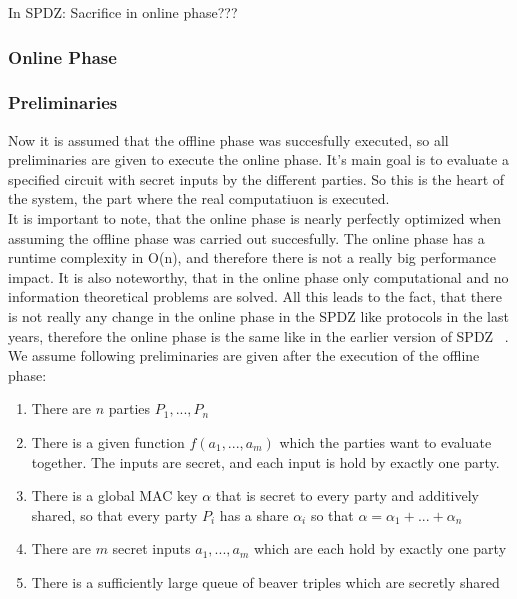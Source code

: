 \documentclass[english,runningheads,a4paper]{llncs}[2018/03/10]
\begin{document}
In SPDZ: Sacrifice in online phase???





\subsubsection{Online Phase}

\subsubsection{Preliminaries}


Now it is assumed that the offline phase was succesfully executed, so all preliminaries are given to execute the online phase. It's main goal is to evaluate a specified circuit with secret inputs by the different parties. So this is the heart of the system, the part where the real computatiuon is executed. \\
It is important to note, that the online phase is nearly perfectly optimized when assuming the offline phase was carried out succesfully. The online phase has a runtime complexity in O(n), and therefore there is not a really big performance impact. It is also noteworthy, that in the online phase only computational and no information theoretical problems are solved. All this leads to the fact, that there is not really any change in the online phase in the SPDZ like protocols in the last years, therefore the online phase is the same like in the earlier version of SPDZ  ~\cite{cryptoeprint:2011:535}.\\


We assume following preliminaries are given after the execution of the offline phase:\\
\begin{enumerate}
\item There are \(n\) parties \(P_1,...,P_n\)
\item There is a given function \(f(a_1,...,a_m)\) which the parties want to evaluate together. The inputs are secret, and each input is hold by exactly one party.
\item There is a global MAC key \( \alpha\) that is secret to every party and additively shared, so that every party \( P_i\) has a share  \( \alpha_i\) so that  \( \alpha=\alpha_1+...+\alpha_n\)
\item There are $m$ secret inputs $a_1,...,a_m$ which are each hold by exactly one party
\item There is a sufficiently large queue of beaver triples which are secretly shared
\end{enumerate}
\end{document}
